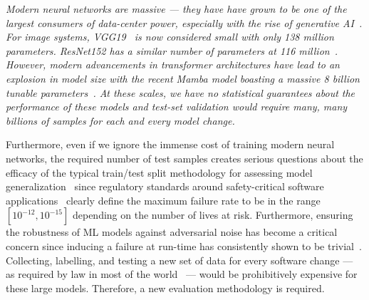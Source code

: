 \documentclass[conference]{IEEEtran}
\newcommand{\cm}[1]{\textit{{\color{blue}#1}}}
\begin{document}
\cm{
Modern neural networks are massive --- they have have grown to be one of the largest consumers of data-center power, especially with the rise of generative AI~\cite{msft_water}. For image systems, VGG19~\cite{vgg} is now considered small with \textit{only} 138 million parameters. ResNet152 has a similar number of parameters at 116 million~\cite{resnet}. However, modern advancements in transformer architectures have lead to an explosion in model size with the recent Mamba model boasting a massive 8 \textit{billion} tunable parameters~\cite{mamba}. At these scales, we have no statistical guarantees about the performance of these models and test-set validation would require many, many billions of samples for each and every model change.
}

Furthermore, even if we ignore the immense cost of training modern neural networks, the required number of test samples creates serious questions about the efficacy of the typical train/test split methodology for assessing model generalization~\cite{meyers} since regulatory standards around safety-critical software applications~\cite{IEC61508,iso26262,aviation_software,safetyframework} clearly define the maximum failure rate to be in the range $[10^{-12}, 10^{-15}]$ depending on the number of lives at risk. Furthermore, ensuring the robustness of ML models against adversarial noise has become a critical concern since inducing a failure at run-time has consistently shown to be trivial~\cite{adversarialpatch, carlini_towards_2017, croce_reliable_2020, hopskipjump, chakraborty2018adversarial, art2018}. Collecting, labelling, and testing a new set of data for every software change --- as required by law in most of the world~\cite{IEC61508,iso26262,aviation_software,safetyframework} --- would be prohibitively expensive for these large models. Therefore, a new evaluation methodology is required.
\end{document}
